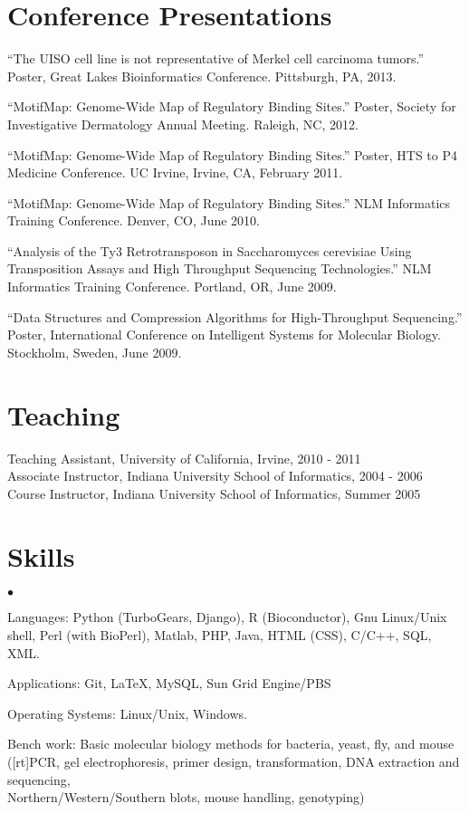 \documentclass[margin,line]{res}
\newenvironment{list2}{
  \begin{list}{$\bullet$}{%
      \setlength{\itemsep}{0in}
      \setlength{\parsep}{0in} \setlength{\parskip}{0in}
      \setlength{\topsep}{0in} \setlength{\partopsep}{0in} 
      \setlength{\leftmargin}{0.2in}}}{\end{list}}
\begin{document}
\begin{resume}
        \newpage

        \section{\sc Conference Presentations}
        ``The UISO cell line is not representative of Merkel cell carcinoma tumors.'' Poster, Great Lakes Bioinformatics Conference. Pittsburgh, PA, 2013.

        ``MotifMap: Genome-Wide Map of Regulatory Binding Sites.'' Poster, Society for Investigative Dermatology Annual Meeting. Raleigh, NC, 2012.

        ``MotifMap: Genome-Wide Map of Regulatory Binding Sites.'' Poster, HTS to P4 Medicine Conference. UC Irvine, Irvine, CA, February 2011.
        
        ``MotifMap: Genome-Wide Map of Regulatory Binding Sites.'' NLM Informatics Training Conference. Denver, CO, June 2010.

        ``Analysis of the Ty3 Retrotransposon in Saccharomyces cerevisiae Using Transposition Assays and High Throughput Sequencing Technologies.'' NLM Informatics Training Conference. Portland, OR, June 2009.

        ``Data Structures and Compression Algorithms for High-Throughput Sequencing.'' Poster, International Conference on Intelligent Systems for Molecular Biology. Stockholm, Sweden, June 2009.

        \section{\sc Teaching}
        Teaching Assistant, University of California, Irvine, 2010 - 2011 \\
        Associate Instructor, Indiana University School of Informatics, 2004 - 2006 \\
        Course Instructor, Indiana University School of Informatics, Summer 2005
                
        \section{\sc Skills} 
        \begin{list2}
        \item Languages: Python (TurboGears, Django), R (Bioconductor), Gnu Linux/Unix shell, Perl (with BioPerl), Matlab, PHP, Java, HTML (CSS), C/C++, SQL, XML.
        \item Applications: Git, \LaTeX, MySQL, Sun Grid Engine/PBS
        \item Operating Systems:  Linux/Unix, Windows.
        \item Bench work: Basic molecular biology methods for bacteria, yeast, fly, and mouse ([rt]PCR, gel electrophoresis, primer design, transformation, DNA extraction and sequencing,\\ Northern/Western/Southern blots, mouse handling, genotyping)
        \end{list2}


\end{resume}
\end{document}
